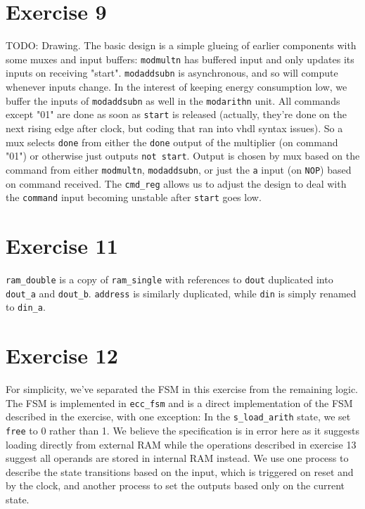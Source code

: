 \documentclass[a4paper,twoside]{article}
\newcommand{\atom}[1]{\mbox{\texttt{#1}}}
\begin{document}
\section*{Exercise 9}
TODO: Drawing. The basic design is a simple glueing of earlier components with
some muxes and input buffers: \atom{modmultn} has buffered input and only
updates its inputs on receiving "start".  \atom{modaddsubn} is asynchronous, and
so will compute whenever inputs change.  In the interest of keeping energy
consumption low, we buffer the inputs of \atom{modaddsubn} as well in the
\atom{modarithn} unit. All commands except "01" are done as soon as \atom{start}
is released (actually, they're done on the next rising edge after clock, but
coding that ran into vhdl syntax issues). So a mux selects \atom{done} from
either the \atom{done} output of the multiplier (on command "01") or otherwise
just outputs \atom{not start}. Output is chosen by mux based on the command from
either \atom{modmultn}, \atom{modaddsubn}, or just the \atom{a} input (on
\atom{NOP}) based on command received. The \atom{cmd\_reg} allows us to adjust
the design to deal with the \atom{command} input becoming unstable after
\atom{start} goes low.

\section*{Exercise 11}
\atom{ram\_double} is a copy of \atom{ram\_single} with references to
\atom{dout} duplicated into \atom{dout\_a} and \atom{dout\_b}. \atom{address} is
similarly duplicated, while \atom{din} is simply renamed to \atom{din\_a}.

\section*{Exercise 12}
For simplicity, we've separated the FSM in this exercise from the remaining
logic. The FSM is implemented in \atom{ecc\_fsm} and is a direct implementation
of the FSM described in the exercise, with one exception: In the
\atom{s\_load\_arith} state, we set \atom{free} to 0 rather than 1. We believe
the specification is in error here as it suggests loading directly from external
RAM while the operations described in exercise 13 suggest all operands are
stored in internal RAM instead. We use one process to describe the state
transitions based on the input, which is triggered on reset and by the clock,
and another process to set the outputs based only on the current state.
\end{document}
